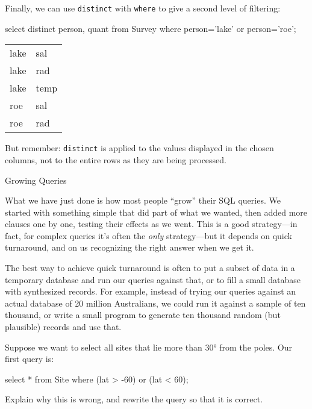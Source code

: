 \documentclass{book}
\begin{document}
Finally, we can use \texttt{distinct} with \texttt{where} to give a
second level of filtering:

\begin{VerbIn}
select distinct person, quant from Survey where person='lake' or person='roe';
\end{VerbIn}

\begin{tabular}{ll}
lake & sal \\
lake & rad \\
lake & temp \\
roe & sal \\
roe & rad \\
\end{tabular}

But remember: \texttt{distinct} is applied to the values displayed in
the chosen columns, not to the entire rows as they are being processed.

\begin{swcbox}{Growing Queries}

What we have just done is how most people ``grow'' their SQL queries. We
started with something simple that did part of what we wanted, then
added more clauses one by one, testing their effects as we went. This is
a good strategy---in fact, for complex queries it's often the
\emph{only} strategy---but it depends on quick turnaround, and on us
recognizing the right answer when we get it.

The best way to achieve quick turnaround is often to put a subset of
data in a temporary database and run our queries against that, or to
fill a small database with synthesized records. For example, instead of
trying our queries against an actual database of 20 million Australians,
we could run it against a sample of ten thousand, or write a small
program to generate ten thousand random (but plausible) records and use
that.

\end{swcbox}

\begin{challenge}
  Suppose we want to select all sites that lie more than 30° from the
  poles. Our first query is:

\begin{VerbIn}
select * from Site where (lat > -60) or (lat < 60);
\end{VerbIn}

  Explain why this is wrong, and rewrite the query so that it is
  correct.
\end{challenge}
\end{document}

